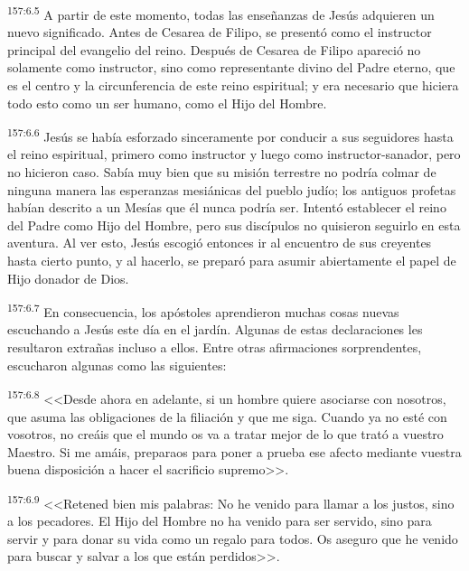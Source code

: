 \par 
\textsuperscript{157:6.5} A partir de este momento, todas las enseñanzas de Jesús adquieren un nuevo significado. Antes de Cesarea de Filipo, se presentó como el instructor principal del evangelio del reino. Después de Cesarea de Filipo apareció no solamente como instructor, sino como representante divino del Padre eterno, que es el centro y la circunferencia de este reino espiritual; y era necesario que hiciera todo esto como un ser humano, como el Hijo del Hombre.

\par 
\textsuperscript{157:6.6} Jesús se había esforzado sinceramente por conducir a sus seguidores hasta el reino espiritual, primero como instructor y luego como instructor-sanador, pero no hicieron caso. Sabía muy bien que su misión terrestre no podría colmar de ninguna manera las esperanzas mesiánicas del pueblo judío; los antiguos profetas habían descrito a un Mesías que él nunca podría ser. Intentó establecer el reino del Padre como Hijo del Hombre, pero sus discípulos no quisieron seguirlo en esta aventura. Al ver esto, Jesús escogió entonces ir al encuentro de sus creyentes hasta cierto punto, y al hacerlo, se preparó para asumir abiertamente el papel de Hijo donador de Dios.

\par 
\textsuperscript{157:6.7} En consecuencia, los apóstoles aprendieron muchas cosas nuevas escuchando a Jesús este día en el jardín. Algunas de estas declaraciones les resultaron extrañas incluso a ellos. Entre otras afirmaciones sorprendentes, escucharon algunas como las siguientes:

\par 
\textsuperscript{157:6.8} <<Desde ahora en adelante, si un hombre quiere asociarse con nosotros, que asuma las obligaciones de la filiación y que me siga. Cuando ya no esté con vosotros, no creáis que el mundo os va a tratar mejor de lo que trató a vuestro Maestro. Si me amáis, preparaos para poner a prueba ese afecto mediante vuestra buena disposición a hacer el sacrificio supremo>>.

\par 
\textsuperscript{157:6.9} <<Retened bien mis palabras: No he venido para llamar a los justos, sino a los pecadores. El Hijo del Hombre no ha venido para ser servido, sino para servir y para donar su vida como un regalo para todos. Os aseguro que he venido para buscar y salvar a los que están perdidos>>.

